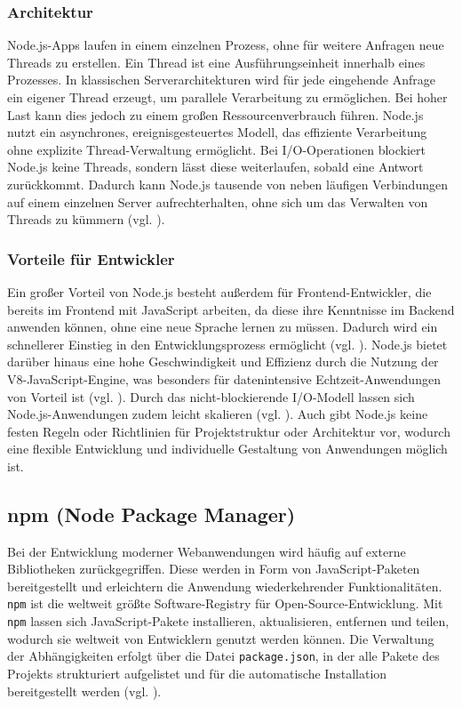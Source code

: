 \documentclass[oneside]{ausarbeitung}
\begin{document}
\subsubsection{Architektur}
Node.js-Apps laufen in einem einzelnen Prozess, ohne für weitere Anfragen neue Threads zu erstellen. Ein Thread ist eine Ausführungseinheit innerhalb eines Prozesses. In klassischen Serverarchitekturen wird für jede eingehende Anfrage ein eigener Thread erzeugt, um parallele Verarbeitung zu ermöglichen. Bei hoher Last kann dies jedoch zu einem großen Ressourcenverbrauch führen. 
Node.js nutzt ein asynchrones, ereignisgesteuertes Modell, das effiziente Verarbeitung ohne explizite Thread-Verwaltung ermöglicht. Bei \ac{I/O}-Operationen blockiert Node.js keine Threads, sondern lässt diese weiterlaufen, sobald eine Antwort zurückkommt. Dadurch kann Node.js tausende von neben läufigen Verbindungen auf einem einzelnen Server aufrechterhalten, ohne sich um das Verwalten von Threads zu kümmern (vgl. \parencite{nodejs}).

\subsubsection{Vorteile für Entwickler}
Ein großer Vorteil von Node.js besteht außerdem für Frontend-Entwickler, die bereits im Frontend mit JavaScript arbeiten, da diese ihre Kenntnisse im Backend anwenden können, ohne eine neue Sprache lernen zu müssen. Dadurch wird ein schnellerer Einstieg in den Entwicklungsprozess ermöglicht (vgl. \parencite{nodejs}). 
Node.js bietet darüber hinaus eine hohe Geschwindigkeit und Effizienz durch die Nutzung der V8-JavaScript-Engine, was besonders für datenintensive Echtzeit-Anwendungen von Vorteil ist (vgl. \parencite{nodejs-v8}).  
Durch das nicht-blockierende \ac{I/O}-Modell lassen sich Node.js-Anwendungen zudem leicht skalieren (vgl. \parencite{nodejs-nonblocking}). Auch gibt Node.js keine festen Regeln oder Richtlinien für Projektstruktur oder Architektur vor, wodurch eine flexible Entwicklung und individuelle Gestaltung von Anwendungen möglich ist.

\subsection{npm (Node Package Manager)}

Bei der Entwicklung moderner Webanwendungen wird häufig auf externe Bibliotheken zurückgegriffen. Diese werden in Form von JavaScript-Paketen bereitgestellt und erleichtern die Anwendung wiederkehrender Funktionalitäten. 
\texttt{npm} ist die weltweit größte Software-Registry für Open-Source-Entwicklung. Mit \texttt{npm} lassen sich JavaScript-Pakete installieren, aktualisieren, entfernen und teilen, wodurch sie weltweit von Entwicklern genutzt werden können. Die Verwaltung der Abhängigkeiten erfolgt über die Datei \texttt{package.json}, in der alle Pakete des Projekts strukturiert aufgelistet und für die automatische Installation bereitgestellt werden (vgl. \parencite{npm}).
\end{document}
